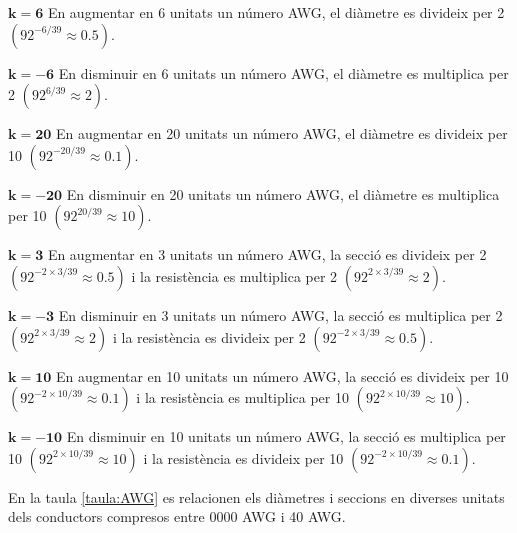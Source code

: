 \begin{list}{}
   {\setlength{\labelwidth}{15mm} \setlength{\leftmargin}{20mm} \setlength{\labelsep}{5mm}}

   \item[$\boldsymbol{k=6}$\hfill] En augmentar en 6  unitats un número AWG, el diàmetre es divideix per 2
                 $(92^{-6/39}\approx \num{0,5})$.

   \item[$\boldsymbol{k=-6}$\hfill] En disminuir en 6 unitats un número AWG, el diàmetre es multiplica per 2
                 $(92^{6/39}\approx 2)$.

   \item[$\boldsymbol{k=20}$\hfill] En augmentar en 20  unitats un número AWG, el diàmetre es divideix per 10
                 $(92^{-20/39}\approx \num{0,1})$.

   \item[$\boldsymbol{k=-20}$\hfill] En disminuir en 20 unitats un número AWG, el diàmetre es multiplica per 10
                 $(92^{20/39}\approx 10)$.

   \item[$\boldsymbol{k=3}$\hfill] En augmentar en 3 unitats un número AWG, la secció es divideix per 2
                 $(92^{-2\times 3/39}\approx \num{0,5})$ i la resistència es multiplica per 2
                 $(92^{2\times 3/39}\approx 2)$.

   \item[$\boldsymbol{k=-3}$\hfill] En disminuir en 3 unitats un número AWG, la secció es multiplica per 2
                  $(92^{2\times 3/39}\approx 2)$ i la resistència es divideix per 2
                  $(92^{-2\times 3/39}\approx \num{0,5})$.

   \item[$\boldsymbol{k=10}$\hfill] En augmentar en 10 unitats un número AWG, la secció es divideix per 10
                 $(92^{-2\times 10/39}\approx \num{0,1})$ i la resistència es multiplica per 10
                 $(92^{2\times 10/39}\approx 10)$.

   \item[$\boldsymbol{k=-10}$\hfill] En disminuir en 10 unitats un número AWG, la secció es multiplica per 10
                  $(92^{2\times 10/39}\approx 10)$ i la resistència es divideix per 10
                  $(92^{-2\times 10/39}\approx \num{0,1})$.
\end{list}

En la taula \vref{taula:AWG} es relacionen els diàmetres i seccions en diverses unitats dels conductors compresos entre 0000 AWG i 40 AWG.

